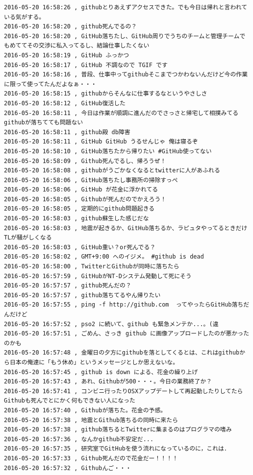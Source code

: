 \begin{verbatim}
2016-05-20 16:58:26 , githubとりあえずアクセスできた。でも今日は帰れと言われている気がする。
2016-05-20 16:58:20 , github死んでるの？
2016-05-20 16:58:20 , GitHub落ちたし、GitHub周りでうちのチームと管理チームでもめててその交渉に私入ってるし、結論仕事したくない
2016-05-20 16:58:19 , GitHub ふっかつ
2016-05-20 16:58:17 , GitHub 不調なので TGIF です
2016-05-20 16:58:16 , 普段、仕事中ってgithubそこまでつかわないんだけど今の作業に限って使ってたんだよなぁ・・・
2016-05-20 16:58:15 , githubからそんなに仕事するなというやさしさ
2016-05-20 16:58:12 , GitHub復活した
2016-05-20 16:58:11 , 今日は作業が順調に進んだのでさっさと帰宅して相撲みてるgithubが落ちてても問題ない
2016-05-20 16:58:11 , github殿 db障害
2016-05-20 16:58:11 , GitHub GitHub うるせんじゃ 俺は寝るぞ
2016-05-20 16:58:10 , GitHub落ちたから帰りたい #GitHub使ってない
2016-05-20 16:58:09 , Github死んでるし、帰ろうぜ！
2016-05-20 16:58:08 , githubがうごかなくなるとtwitterに人があふれる
2016-05-20 16:58:06 , GitHub落ちたし事務所の掃除すっぺ
2016-05-20 16:58:06 , GitHub が花金に浮かれてる
2016-05-20 16:58:05 , Githubが死んだのでかえろう！
2016-05-20 16:58:05 , 定期的にgithub問題起きる
2016-05-20 16:58:03 , github蘇生した感じだな
2016-05-20 16:58:03 , 地震が起きるか、GitHub落ちるか、ラピュタやってるときだけTLが騒がしくなる
2016-05-20 16:58:03 , GitHub重い？or死んでる？
2016-05-20 16:58:02 , GMT+9:00 へのイジメ。 #github is dead
2016-05-20 16:58:00 , TwitterとGithubが同時に落ちたら
2016-05-20 16:57:59 , GitHubがNT-Dシステム発動して死にそう
2016-05-20 16:57:57 , github死んだの？
2016-05-20 16:57:57 , github落ちてるやん帰りたい
2016-05-20 16:57:55 , ping -f http://github.com  ってやったらGitHub落ちだんだけど
2016-05-20 16:57:52 , pso2 に続いて、github も緊急メンテか...。(違
2016-05-20 16:57:51 , ごめん、さっき github に画像アップロードしたのが悪かったのかも
2016-05-20 16:57:48 , 金曜日の夕方にgithubを落としてくるとは、これはgithubから日本の俺達に「もう休め」というメッセージとしか思えないな。
2016-05-20 16:57:45 , github is down による、花金の繰り上げ
2016-05-20 16:57:43 , あれ、Githubが500・・・。今日の業務終了か？
2016-05-20 16:57:41 , コンビニ行ったりOSXアップデートして再起動したりしてたらGithubも死んでとにかく何もできない人になった
2016-05-20 16:57:40 , Githubが落ちた。花金の予感。
2016-05-20 16:57:38 , 地震とGithub落ちるの同時に来たら
2016-05-20 16:57:38 , github落ちるとTwitterに集まるのはプログラマの嗜み
2016-05-20 16:57:36 , なんかgithub不安定だ...
2016-05-20 16:57:35 , 研究室でGitHubを使う流れになっているのに，これは．
2016-05-20 16:57:33 , Github死んだので花金だー！！！！
2016-05-20 16:57:32 , Githubんご・・・

\end{verbatim}
